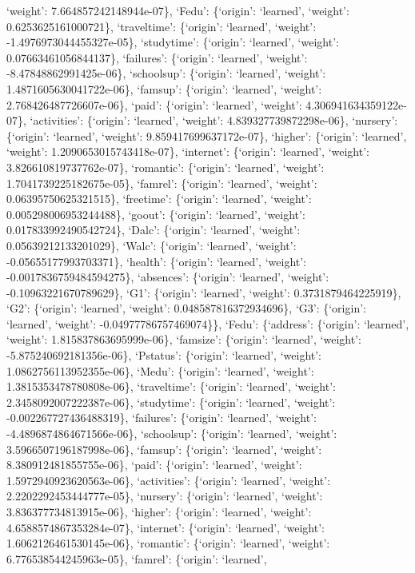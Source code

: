 \documentclass[
]{article}
\begin{document}
`weight': 7.664857242148944e-07\}, `Fedu': \{`origin': `learned',
`weight': 0.6253625161000721\}, `traveltime': \{`origin': `learned',
`weight': -1.4976973044455327e-05\}, `studytime': \{`origin': `learned',
`weight': 0.07663461056844137\}, `failures': \{`origin': `learned',
`weight': -8.47848862991425e-06\}, `schoolsup': \{`origin': `learned',
`weight': 1.4871605630041722e-06\}, `famsup': \{`origin': `learned',
`weight': 2.768426487726607e-06\}, `paid': \{`origin': `learned',
`weight': 4.306941634359122e-07\}, `activities': \{`origin': `learned',
`weight': 4.839327739872298e-06\}, `nursery': \{`origin': `learned',
`weight': 9.859417699637172e-07\}, `higher': \{`origin': `learned',
`weight': 1.2090653015743418e-07\}, `internet': \{`origin': `learned',
`weight': 3.826610819737762e-07\}, `romantic': \{`origin': `learned',
`weight': 1.7041739225182675e-05\}, `famrel': \{`origin': `learned',
`weight': 0.06395750625321515\}, `freetime': \{`origin': `learned',
`weight': 0.005298006953244488\}, `goout': \{`origin': `learned',
`weight': 0.017833992490542724\}, `Dalc': \{`origin': `learned',
`weight': 0.05639212133201029\}, `Walc': \{`origin': `learned',
`weight': -0.05655177993703371\}, `health': \{`origin': `learned',
`weight': -0.0017836759484594275\}, `absences': \{`origin': `learned',
`weight': -0.10963221670789629\}, `G1': \{`origin': `learned', `weight':
0.3731879464225919\}, `G2': \{`origin': `learned', `weight':
0.048587816372934696\}, `G3': \{`origin': `learned', `weight':
-0.04977786757469074\}\}, `Fedu': \{`address': \{`origin': `learned',
`weight': 1.815837863695999e-06\}, `famsize': \{`origin': `learned',
`weight': -5.875240692181356e-06\}, `Pstatus': \{`origin': `learned',
`weight': 1.0862756113952355e-06\}, `Medu': \{`origin': `learned',
`weight': 1.3815353478780808e-06\}, `traveltime': \{`origin': `learned',
`weight': 2.3458092007222387e-06\}, `studytime': \{`origin': `learned',
`weight': -0.002267727436488319\}, `failures': \{`origin': `learned',
`weight': -4.4896874864671566e-06\}, `schoolsup': \{`origin': `learned',
`weight': 3.5966507196187998e-06\}, `famsup': \{`origin': `learned',
`weight': 8.380912481855755e-06\}, `paid': \{`origin': `learned',
`weight': 1.5972940923620563e-06\}, `activities': \{`origin': `learned',
`weight': 2.2202292453444777e-05\}, `nursery': \{`origin': `learned',
`weight': 3.836377734813915e-06\}, `higher': \{`origin': `learned',
`weight': 4.6588574867353284e-07\}, `internet': \{`origin': `learned',
`weight': 1.6062126461530145e-06\}, `romantic': \{`origin': `learned',
`weight': 6.776538544245963e-05\}, `famrel': \{`origin': `learned',
\end{document}
